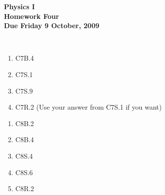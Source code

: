 \documentclass[12pt]{article}
\begin{document}
\pagestyle{empty}
 
\begin{center}
{\large {\bf Physics I}}\\
\medskip
{\large {\bf Homework Four}}\\
\medskip
{ {\bf Due Friday 9 October, 2009}}\\
\end{center}

\hspace{2mm}\\


\begin{enumerate}
\setlength{\itemsep}{-1mm}
  \item C7B.4
  \item C7S.1
  \item C7S.9
  \item C7R.2  (Use your answer from C7S.1 if you want)
\end{enumerate}



\begin{enumerate}
\setlength{\itemsep}{-1mm}
  \item C8B.2
  \item C8B.4
  \item C8S.4
  \item C8S.6
  \item C8R.2
\end{enumerate}
\end{document}
